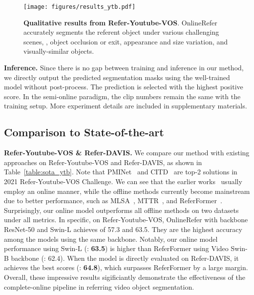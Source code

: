 \documentclass[10pt,twocolumn,letterpaper]{article}
\begin{document}
\begin{figure*}
\centering
	\texttt{[image: figures/results\_ytb.pdf]}
	\vspace{-10pt}
	\caption{\textbf{Qualitative results from Refer-Youtube-VOS}. OnlineRefer accurately segments the referent object under various challenging scenes, \eg, object occlusion or exit, appearance and size variation, and visually-similar objects.}
	\vspace{-4pt}
	\label{fig:result_ytb}
\end{figure*}

\noindent\textbf{Inference.}
Since there is no gap between training and inference in our method, we directly output the predicted segmentation masks using the well-trained model without post-process.
The prediction is selected with the highest positive score.
In the semi-online paradigm, the clip numbers remain the same with the training setup.
More experiment details are included in supplementary materials.




\subsection{Comparison to State-of-the-art}

\noindent\textbf{Refer-Youtube-VOS \& Refer-DAVIS.}
We compare our method with existing approaches on Refer-Youtube-VOS and Refer-DAVIS, as shown in Table~\ref{table:sota_ytb}.
Note that PMINet~\cite{ding2021progressive} and CITD~\cite{liang2021rethinking} are top-2 solutions in 2021 Refer-Youtube-VOS Challenge.
We can see that the earlier works~\cite{CMSA,URVOS} usually employ an online manner, while the offline methods currently become mainstream due to better performance, such as MLSA~\cite{mlsa}, MTTR~\cite{mttr}, and ReferFormer~\cite{referformer}.
Surprisingly, our online model outperforms all offline methods on two datasets under all metrics.
In specific, on Refer-Youtube-VOS, OnlineRefer with backbone ResNet-50 and Swin-L achieves  of 57.3 and 63.5.
They are the highest accuracy among the models using the same backbone.
Notably, our online model performance using Swin-L (: \textbf{63.5}) is higher than ReferFormer using Video Swin-B backbone (: 62.4).
When the model is directly evaluated on Refer-DAVIS, it achieves the best scores (: \textbf{64.8}), which surpasses ReferFormer by a large margin.
Overall, these impressive results sigificiantly demonstrate the effectiveness of the complete-online pipeline in referring video object segmentation.
\end{document}
